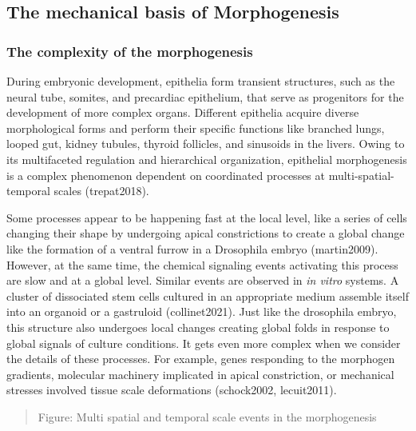 \documentclass[
]{article}
\begin{document}
\hypertarget{the-mechanical-basis-of-morphogenesis-1}{%
\subsection{The mechanical basis of
Morphogenesis}\label{the-mechanical-basis-of-morphogenesis-1}}

\hypertarget{the-complexity-of-the-morphogenesis}{%
\subsubsection{The complexity of the
morphogenesis}\label{the-complexity-of-the-morphogenesis}}

During embryonic development, epithelia form transient structures, such
as the neural tube, somites, and precardiac epithelium, that serve as
progenitors for the development of more complex organs. Different
epithelia acquire diverse morphological forms and perform their specific
functions like branched lungs, looped gut, kidney tubules, thyroid
follicles, and sinusoids in the livers. Owing to its multifaceted
regulation and hierarchical organization, epithelial morphogenesis is a
complex phenomenon dependent on coordinated processes at
multi-spatial-temporal scales (trepat2018).

Some processes appear to be happening fast at the local level, like a
series of cells changing their shape by undergoing apical constrictions
to create a global change like the formation of a ventral furrow in a
Drosophila embryo (martin2009). However, at the same time, the chemical
signaling events activating this process are slow and at a global level.
Similar events are observed in \emph{in vitro} systems. A cluster of
dissociated stem cells cultured in an appropriate medium assemble itself
into an organoid or a gastruloid (collinet2021). Just like the
drosophila embryo, this structure also undergoes local changes creating
global folds in response to global signals of culture conditions. It
gets even more complex when we consider the details of these processes.
For example, genes responding to the morphogen gradients, molecular
machinery implicated in apical constriction, or mechanical stresses
involved tissue scale deformations (schock2002, lecuit2011).

\begin{quote}
Figure: Multi spatial and temporal scale events in the morphogenesis
\end{quote}
\end{document}
